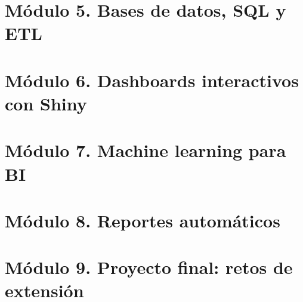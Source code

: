 \section{Módulo 5. Bases de datos, SQL y ETL}


\section{Módulo 6. Dashboards interactivos con Shiny}


\section{Módulo 7. Machine learning para BI}


\section{Módulo 8. Reportes automáticos}


\section{Módulo 9. Proyecto final: retos de extensión}

